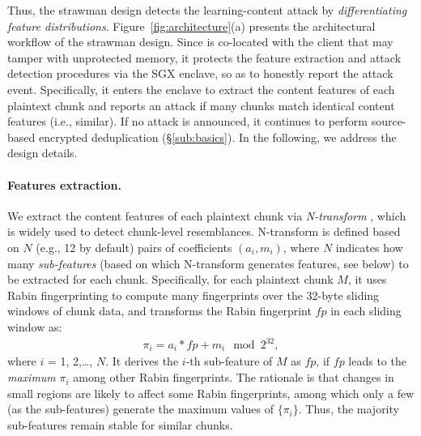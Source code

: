 Thus, the strawman design detects the learning-content attack by {\em differentiating feature distributions}. Figure~\ref{fig:architecture}(a) presents the architectural workflow of the strawman design.
Since \sysnameF is co-located with the client that may tamper with unprotected memory, it protects the feature extraction and attack detection procedures via the SGX enclave, so as to honestly report the attack event. Specifically, it enters the enclave to extract the content features of each plaintext chunk and reports an attack if many chunks match identical content features (i.e., similar). If no attack is announced, it continues to perform source-based encrypted deduplication (\S\ref{sub:basics}). In the following, we address the design details.




\paragraph{Features extraction.}
We extract the content features of each plaintext chunk via {\em N-transform} \cite{shilane12}, which is widely used to
detect chunk-level resemblances. N-transform is defined based on $N$ (e.g., 12 by default) pairs of coefficients $(a_i, m_i)$, where $N$ indicates how many {\em sub-features} (based on which N-transform generates features, see below) to be extracted for each chunk. Specifically, for each plaintext chunk $M$, it uses Rabin fingerprinting \cite{rabin81} to compute many fingerprints over the 32-byte sliding windows of chunk data, and transforms the Rabin fingerprint $fp$ in each sliding  window as:
\begin{eqnarray}
  \label{eq:feature}
  \pi_i = a_i * fp + m_i \mod 2^{32},
\end{eqnarray}
where $i$ = 1, 2,\ldots, $N$. It derives the $i$-th sub-feature of $M$ as $fp$, if $fp$ leads to the {\em maximum} $\pi_i$ among other Rabin fingerprints. The rationale is that changes in small regions are likely to affect some Rabin fingerprints, among which only a few (as the sub-features) generate the maximum values of $\{\pi_i\}$. Thus, the majority sub-features remain stable for similar chunks.

